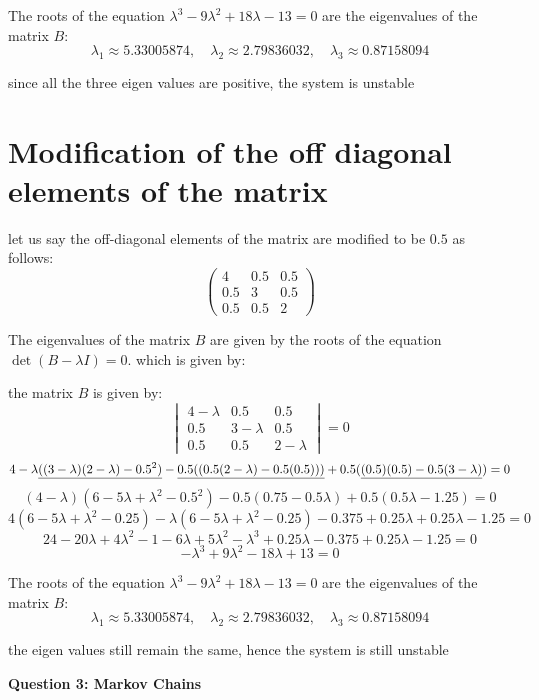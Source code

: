 \documentclass{article}
\begin{document}
The roots of the equation \(\lambda^3 - 9\lambda^2 + 18\lambda - 13 = 0\) are the eigenvalues of the matrix \(B\):
\[\lambda_1 \approx 5.33005874, \quad \lambda_2 \approx 2.79836032, \quad \lambda_3 \approx 0.87158094\]

since all the three eigen values are positive, the system is unstable

\section{Modification of the off diagonal elements of the matrix}

let us say the off-diagonal elements of the matrix are modified to be \(0.5\) as follows:
\[\begin{pmatrix}
4 & 0.5 & 0.5 \\
0.5 & 3 & 0.5 \\
0.5 & 0.5 & 2
\end{pmatrix}\]

The eigenvalues of the matrix \(B\) are given by the roots of the equation \(\det(B - \lambda I) = 0\). which is given by:

the matrix \(B\) is given by:
\[\begin{vmatrix}
4-\lambda & 0.5 & 0.5 \\
0.5 & 3-\lambda & 0.5 \\
0.5 & 0.5 & 2-\lambda
\end{vmatrix} = 0\]
\[4-\lambda\uline{((3-\lambda)(2-\lambda) - 0.5^2)} - \uline{0.5((0.5(2-\lambda) - 0.5(0.5)))} + 0.5(\uline{(0.5)(0.5)-0.5(3-\lambda)}) = 0\]
\[(4-\lambda)(6 - 5\lambda + \lambda^2 - 0.5^2) - 0.5(0.75-0.5\lambda) + 0.5(0.5\lambda -1.25) = 0\]
\[4(6 - 5\lambda + \lambda^2 - 0.25) -\lambda(6-5\lambda + \lambda^2 - 0.25) - 0.375 + 0.25\lambda + 0.25\lambda - 1.25 = 0\]
\[24 - 20\lambda + 4\lambda^2 - 1 - 6\lambda + 5\lambda^2 - \lambda^3 + 0.25\lambda - 0.375 + 0.25\lambda - 1.25 = 0\]
\[-\lambda^3 + 9\lambda^2 - 18\lambda + 13 = 0\]

The roots of the equation \(\lambda^3 - 9\lambda^2 + 18\lambda - 13 = 0\) are the eigenvalues of the matrix \(B\):
\[\lambda_1 \approx 5.33005874, \quad \lambda_2 \approx 2.79836032, \quad \lambda_3 \approx 0.87158094\]

the eigen values still remain the same, hence the system is still unstable

\begin{center}
    \large \textbf{Question 3: Markov Chains}
\end{center}
\end{document}
